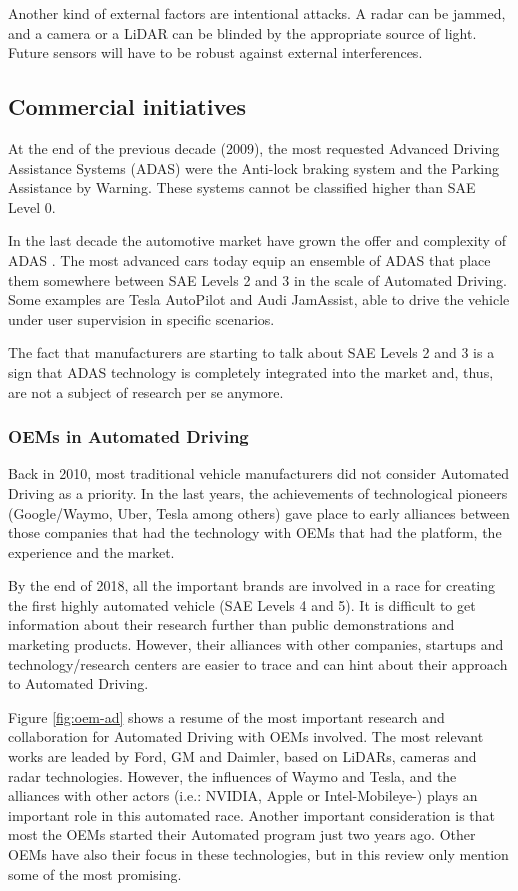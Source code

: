 Another kind of external factors are intentional attacks. A radar can be jammed,
and a camera or a LiDAR can be blinded by the appropriate source of light.
Future sensors will have to be robust against external interferences.

\subsection{Commercial initiatives}

At the end of the previous decade (2009), 
the most requested  Advanced Driving Assistance Systems (ADAS) 
\cite{Frost&Sullivan2010} were the Anti-lock braking system and the Parking 
Assistance by Warning. These systems cannot be classified
higher than SAE Level 0.

In the last decade the automotive market have grown the offer and complexity
of ADAS \cite{Perez2016}. The most advanced cars today equip an ensemble of 
ADAS that place them somewhere between SAE Levels 2 and 3 in the scale of Automated
Driving. Some examples are Tesla AutoPilot and Audi JamAssist, able to
drive the vehicle under user supervision in specific scenarios.

The fact that manufacturers are starting to talk about SAE Levels 2 and 3
is a sign that ADAS technology is completely integrated into the market and, thus, are not a subject of research per se anymore.  

\subsubsection{OEMs in Automated Driving}
\label{sec:oem-ad}

Back in 2010, most traditional vehicle manufacturers did not consider Automated
Driving as a priority. In the last years, the achievements of technological 
pioneers (Google/Waymo, Uber, Tesla among others) gave place to early alliances
between those companies that had the technology with OEMs that had the
platform, the experience and the market.

By the end of 2018, all the important brands are involved in a race for creating
the first highly automated vehicle (SAE Levels 4 and 5). It is difficult to
get information about their research further than public demonstrations and
marketing products. However, their alliances with other companies, startups
and technology/research centers are easier to trace and can hint about their 
approach to Automated Driving.


Figure \ref{fig:oem-ad} shows a resume of the most important research and collaboration for Automated Driving with OEMs involved. The most relevant works are leaded by Ford, GM and Daimler, based on LiDARs, cameras and radar technologies. However, the influences of Waymo and Tesla, and the alliances with other actors (i.e.: NVIDIA, Apple or Intel-Mobileye-) plays an important role in this automated race. Another important consideration is that most the OEMs started their Automated program just two years ago. Other OEMs have also their focus in these technologies, but in this review only mention some of the most promising.




